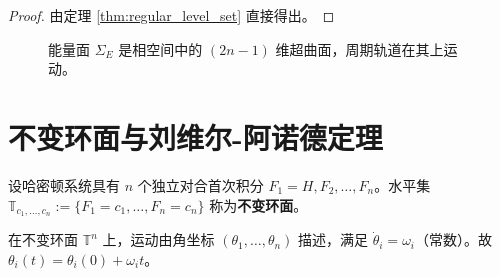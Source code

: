 \begin{proof}
由定理 \ref{thm:regular_level_set} 直接得出。
\end{proof}

\begin{figure}[htbp]
\centering
{}
\caption{能量面 $\Sigma_E$ 是相空间中的 $(2n-1)$ 维超曲面，周期轨道在其上运动。}
\label{fig:energy_surface}
\end{figure}

\section{不变环面与刘维尔-阿诺德定理}
\label{sec:invariant_torus}

\begin{definition}[不变环面]\label{def:invariant_torus}
设哈密顿系统具有 $n$ 个独立对合首次积分 $F_1 = H, F_2, \dots, F_n$。水平集 $\mathbb{T}_{c_1, \dots, c_n} := \{F_1 = c_1, \dots, F_n = c_n\}$ 称为\textbf{不变环面}。
\end{definition}

\begin{proposition}[不变环面上的运动]\label{prop:invariant_torus_motion}
在不变环面 $\mathbb{T}^n$ 上，运动由角坐标 $(\theta_1, \dots, \theta_n)$ 描述，满足 $\dot{\theta}_i = \omega_i$（常数）。故 $\theta_i(t) = \theta_i(0) + \omega_i t$。
\end{proposition}

